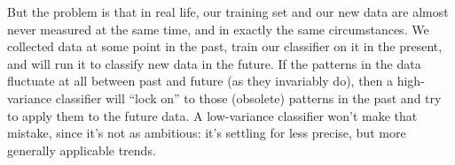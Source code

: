 But the problem is that in real life, our training set and our new data are
almost never measured at the same time, and in exactly the same circumstances.
We collected data at some point in the past, train our classifier on it in the
present, and will run it to classify new data in the future. If the patterns in
the data fluctuate at all between past and future (as they invariably do), then
a high-variance classifier will ``lock on'' to those (obsolete) patterns in the
past and try to apply them to the future data. A low-variance classifier won't
make that mistake, since it's not as ambitious: it's settling for less precise,
but more generally applicable trends.


%
%
%
%
